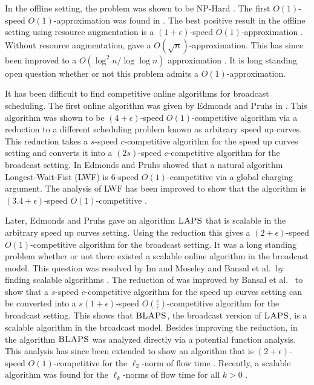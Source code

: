 \documentclass[11pt]{article}
\newcommand{\etal}{et al.\ }
\newcommand{\eps}{\epsilon}
\newcommand{\blaps}{\textrm{\sc BLAPS}}
\newcommand{\laps}{\textrm{\sc LAPS}}
\begin{document}
In the offline setting,  the problem was shown to be NP-Hard \cite{ErlebachH02,ChangEGK08}.  The first $O(1)$-speed $O(1)$-approximation was found in \cite{KalyanasundaramPV00}. The best positive result in the offline setting using resource augmentation is a $(1+\eps)$-speed $O(1)$-approximation \cite{BansalCKN05}.    Without resource augmentation, \cite{BansalCKN05} gave a $O(\sqrt{n})$-approximation.  This has since been improved to a $O(\log^2 n/ \log \log n)$ approximation \cite{BansalCS06}.  It is long standing open question whether or not this problem admits a $O(1)$-approximation.

It has been difficult to find competitive online algorithms for broadcast scheduling.  The first online algorithm was given by Edmonds and Pruhs in \cite{EdmondsP03}.  This algorithm was shown to be $(4+\eps)$-speed $O(1)$-competitive algorithm via a reduction to a different scheduling problem known as arbitrary speed up curves.   This reduction takes a $s$-speed $c$-competitive algorithm for the speed up curves setting and converts it into a $(2s)$-speed $c$-competitive algorithm for the broadcast setting.  In \cite{EdmondsP04} Edmonds and Pruhs showed that a natural algorithm Longest-Wait-Fist (LWF) is $6$-speed $O(1)$-competitive via a global charging argument.  The analysis of LWF has been improved to show that the algorithm is $(3.4+\eps)$-speed $O(1)$-competitive \cite{Chekuri09lwf}. 

Later, Edmonds and Pruhs \cite{EdmondsP09} gave an algorithm $\laps$ that is scalable in the arbitrary speed up curves setting.  Using the reduction \cite{EdmondsP03} this gives a $(2+\eps)$-speed $O(1)$-competitive algorithm for the broadcast setting. It was a long standing problem whether or not there existed a scalable online algorithm in the broadcast model.  This question was  resolved by Im and Moseley and Bansal \etal by finding scalable algorithms \cite{ImM10,BansalKN09}. The reduction of \cite{EdmondsP03} was improved by Bansal \etal \cite{BansalKN09} to show that a $s$-speed $c$-competitive algorithm for the speed up curves setting can be converted into a $s(1+\eps)$-speed $O(\frac{c}{\eps})$-competitive algorithm for the broadcast setting.  This shows that $\blaps$, the broadcast version of $\laps$, is a scalable algorithm in the broadcast model.  Besides improving the reduction, in \cite{BansalKN09} the algorithm $\blaps$ was analyzed directly via a potential function analysis.  This analysis has since been extended to show an algorithm that is $(2+\eps)$-speed $O(1)$-competitive for the $\ell_2$-norm of flow time \cite{GuptaIKMP10}.  Recently, a scalable algorithm was found for the $\ell_k$-norms of flow time for all $k>0$ \cite{EdmondsIM10}.  \\
\end{document}
